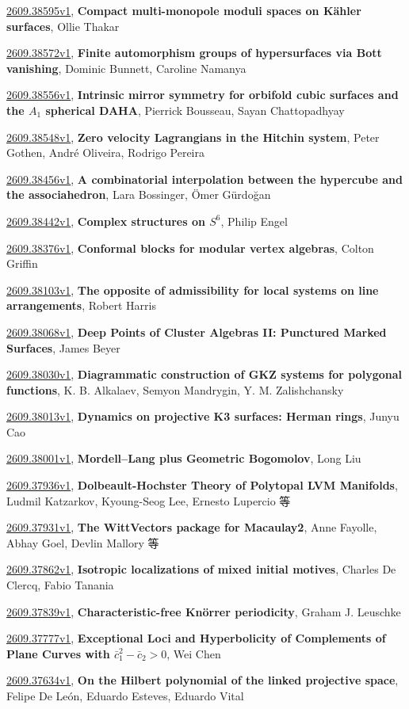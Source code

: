 \documentclass[9pt, a4paper]{article}
\theoremstyle{plain}
\theoremstyle{definition}
\theoremstyle{remark}
\newcommand{\arxiv}[3]{\href{https://arxiv.org/abs/#1}{#1}, \textbf{\textcolor{arxivblue}{#2}}, #3}
\begin{document}
\arxiv{2609.38595v1}{Compact multi-monopole moduli spaces on Kähler surfaces}{Ollie Thakar}

\arxiv{2609.38572v1}{Finite automorphism groups of hypersurfaces via Bott vanishing}{Dominic Bunnett, Caroline Namanya}

\arxiv{2609.38556v1}{Intrinsic mirror symmetry for orbifold cubic surfaces and the $A_1$ spherical DAHA}{Pierrick Bousseau, Sayan Chattopadhyay}

\arxiv{2609.38548v1}{Zero velocity Lagrangians in the Hitchin system}{Peter Gothen, André Oliveira, Rodrigo Pereira}

\arxiv{2609.38456v1}{A combinatorial interpolation between the hypercube and the associahedron}{Lara Bossinger, Ömer Gürdoğan}

\arxiv{2609.38442v1}{Complex structures on $S^6$}{Philip Engel}

\arxiv{2609.38376v1}{Conformal blocks for modular vertex algebras}{Colton Griffin}

\arxiv{2609.38103v1}{The opposite of admissibility for local systems on line arrangements}{Robert Harris}

\arxiv{2609.38068v1}{Deep Points of Cluster Algebras II: Punctured Marked Surfaces}{James Beyer}

\arxiv{2609.38030v1}{Diagrammatic construction of GKZ systems for polygonal functions}{K. B. Alkalaev, Semyon Mandrygin, Y. M. Zalishchansky}

\arxiv{2609.38013v1}{Dynamics on projective K3 surfaces: Herman rings}{Junyu Cao}

\arxiv{2609.38001v1}{Mordell--Lang plus Geometric Bogomolov}{Long Liu}

\arxiv{2609.37936v1}{Dolbeault-Hochster Theory of Polytopal LVM Manifolds}{Ludmil Katzarkov, Kyoung-Seog Lee, Ernesto Lupercio 等}

\arxiv{2609.37931v1}{The WittVectors package for Macaulay2}{Anne Fayolle, Abhay Goel, Devlin Mallory 等}

\arxiv{2609.37862v1}{Isotropic localizations of mixed initial motives}{Charles De Clercq, Fabio Tanania}

\arxiv{2609.37839v1}{Characteristic-free Knörrer periodicity}{Graham J. Leuschke}

\arxiv{2609.37777v1}{Exceptional Loci and Hyperbolicity of Complements of Plane Curves with $\bar{c}_1^2 - \bar{c}_2 > 0$}{Wei Chen}

\arxiv{2609.37634v1}{On the Hilbert polynomial of the linked projective space}{Felipe De León, Eduardo Esteves, Eduardo Vital}
\end{document}
